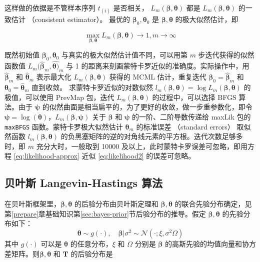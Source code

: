 \documentclass[12pt,a4paper,UTF8,twoside]{book}
\theoremstyle{definition}
\theoremstyle{definition}
\theoremstyle{definition}
\theoremstyle{remark}
\begin{document}
\noindent 这样做的依据是不管样本序列 \(t_{(i)}\) 是否相关， \(L_{m}(\boldsymbol{\beta},\boldsymbol{\theta})\) 都是 \(L_{m}(\boldsymbol{\beta},\boldsymbol{\theta})\) 的一致估计 （consistent estimator）\citep{PrevMap2017JSS}。 最优的 \(\boldsymbol{\beta}_0,\boldsymbol{\theta}_0\) 是 \(\boldsymbol{\beta},\boldsymbol{\theta}\) 的极大似然估计，即

\[
\max_{\boldsymbol{\beta},\boldsymbol{\theta}}L_{m}(\boldsymbol{\beta},\boldsymbol{\theta}) \rightarrow 1, m \rightarrow\infty
\]

\noindent 既然初始值 \(\boldsymbol{\beta}_{0},\boldsymbol{\theta}_{0}\) 与真实的极大似然估计值不同，可以用第 \(m\) 步迭代获得的似然函数值 \(L_{m}(\hat{\boldsymbol{\beta}}_{m}, \hat{\boldsymbol{\theta})}_{m}\) 与 1 的距离来刻画蒙特卡罗近似的准确度。实际操作中，用 \(\hat{\boldsymbol{\beta}}_{m}\) 和 \(\hat{\boldsymbol{\theta}}_{m}\) 表示最大化 \(L_{m}(\boldsymbol{\beta}, \boldsymbol{\theta})\) 获得的 MCML 估计，重复迭代 \(\boldsymbol{\beta}_{0} = \hat{\boldsymbol{\beta}}_{m}\) 和 \(\boldsymbol{\theta}_{0} = \hat{\boldsymbol{\theta}}_{m}\) 直到收敛。 求蒙特卡罗近似的对数似然 \(l_{m}(\boldsymbol{\beta}, \boldsymbol{\theta}) = \log L_{m}(\boldsymbol{\beta}, \boldsymbol{\theta})\) 的极值，可以使用 PrevMap 包，迭代 \(L_{m}(\boldsymbol{\beta}, \boldsymbol{\theta})\) 的过程中，可以选择 BFGS 算法。由于 \(\boldsymbol{\psi}\) 的似然曲面是相当扁平的，为了更好的收敛，做一步重参数化，即令 \(\boldsymbol{\psi} = \log(\boldsymbol{\theta})\)，\(L_{m}(\boldsymbol{\beta}, \boldsymbol{\psi})\) 关于 \(\boldsymbol{\beta}\) 和 \(\boldsymbol{\psi}\) 的一阶、二阶导数传递给 maxLik 包的 \texttt{maxBFGS} 函数。蒙特卡罗极大似然估计 \(\boldsymbol{\theta}_{m}\) 的标准误差 （standard errors） 取似然函数 \(l_{m}(\boldsymbol{\beta},\boldsymbol{\theta})\) 的负黑塞矩阵的逆的对角线元素的平方根。迭代次数足够多时，即 \(m\) 充分大时，一般取到 10000 及以上，此时蒙特卡罗误差可忽略，即用方程 \eqref{eq:likelihood-approx} 近似 \eqref{eq:likelihood2} 的误差可忽略。

\hypertarget{sec:MCMC}{%
\subsection{贝叶斯 Langevin-Hastings 算法}\label{sec:MCMC}}

在贝叶斯框架里，\(\boldsymbol{\beta}, \boldsymbol{\theta}\) 的后验分布由贝叶斯定理和 \(\boldsymbol{\beta}, \boldsymbol{\theta}\) 的联合先验分布确定，见第\ref{prepare}章基础知识第\ref{sec:bayes-prior}节后验分布的推导。假定 \(\boldsymbol{\beta}, \boldsymbol{\theta}\) 的先验分布如下：
\[ \boldsymbol{\theta} \sim  g(\cdot), \quad \boldsymbol{\beta} | \sigma^2 \sim  \mathcal{N}(\cdot; \xi, \sigma^2 \Omega) \]
\noindent 其中 \(g(\cdot)\) 可以是 \(\boldsymbol{\theta}\) 的任意分布，\(\xi\) 和 \(\Omega\) 分别是 \(\boldsymbol{\beta}\) 的高斯先验的均值向量和协方差矩阵。则\(\boldsymbol{\beta}, \boldsymbol{\theta}\) 和 \(\mathbf{T}\) 的后验分布是
\end{document}
